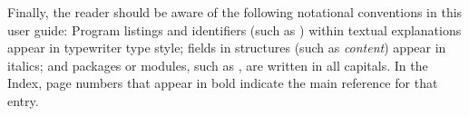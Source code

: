Finally, the reader should be aware of the following notational conventions
in this user guide:  Program listings and identifiers (such as ) 
within textual explanations appear in typewriter type style; 
fields in {\C} structures (such as {\em content}) appear in italics;
and packages or modules, such as {\cvdense}, are written in all capitals. 
In the Index, page numbers that appear in bold indicate the main reference
for that entry. 